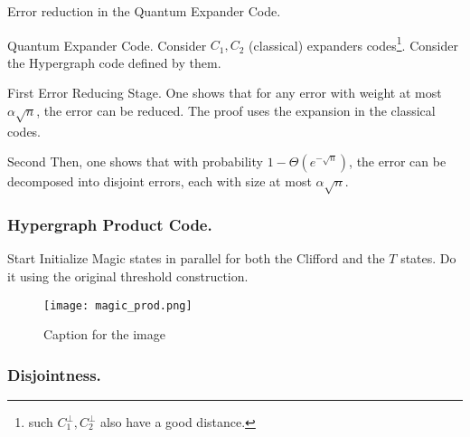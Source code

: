 \documentclass{beamer}
\begin{document}
\begin{frame}{Error reduction in the Quantum Expander Code.}
  \begin{block}{Quantum Expander Code.}
    Consider $C_{1},C_{2}$ (classical) expanders codes\footnote{such $C_{1}^{\perp}, C_{2}^{\perp}$ also have a good distance.}. Consider the Hypergraph code defined by them.
  \end{block}


  \begin{block}{First}
  Error  Reducing Stage. One shows that for any error with weight at most $\alpha \sqrt{n}$, the error can be reduced. The proof uses the expansion in the classical codes.
\end{block}

\begin{block}{Second}
  Then, one shows that with probability $1 - \Theta(e^{-\sqrt{n}})$, the error can be decomposed into disjoint errors, each with size at most $\alpha \sqrt{n}$.
  \end{block} 
\end{frame}


\begin{frame}
  \frametitle{Hypergraph Product Code.}

  \begin{block}{Start}
Initialize Magic states in parallel for both the Clifford and the $T$ states. Do it using the original threshold construction.
  \end{block}


\begin{figure}[h]
    \centering
    \texttt{[image: magic\_prod.png]}
    \caption{Caption for the image}
    \label{fig:your-label}
\end{figure}
\end{frame}



\begin{frame}
  \frametitle{Disjointness.}
\end{frame}
\end{document}
